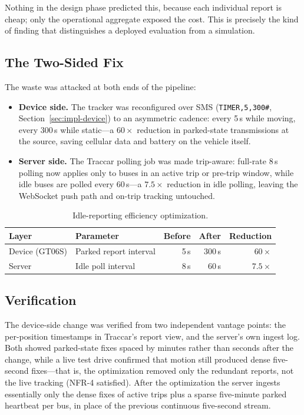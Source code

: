 Nothing in the design phase predicted this, because each individual
report is cheap; only the operational aggregate exposed the cost. This
is precisely the kind of finding that distinguishes a deployed
evaluation from a simulation.

\subsection{The Two-Sided Fix}
The waste was attacked at both ends of the pipeline:

\begin{itemize}
  \item \textbf{Device side.} The tracker was reconfigured over SMS
  (\texttt{TIMER,5,300\#}, Section~\ref{sec:impl-device}) to an
  asymmetric cadence: every 5\,s while moving, every 300\,s while
  static---a $60\times$ reduction in parked-state transmissions at the
  source, saving cellular data and battery on the vehicle itself.
  \item \textbf{Server side.} The Traccar polling job was made
  trip-aware: full-rate 8\,s polling now applies only to buses in an
  active trip or pre-trip window, while idle buses are polled every
  60\,s---a $7.5\times$ reduction in idle polling, leaving the WebSocket
  push path and on-trip tracking untouched.
\end{itemize}

\begin{table}[H]
\caption{Idle-reporting efficiency optimization.}
\label{tab:efficiency}
\centering
\begin{tabular}{@{}llrrr@{}}
\toprule
\textbf{Layer} & \textbf{Parameter} & \textbf{Before} & \textbf{After}
& \textbf{Reduction} \\
\midrule
Device (GT06S) & Parked report interval & 5\,s & 300\,s & $60\times$ \\
Server         & Idle poll interval     & 8\,s & 60\,s  & $7.5\times$ \\
\bottomrule
\end{tabular}
\end{table}

\subsection{Verification}
The device-side change was verified from two independent vantage
points: the per-position timestamps in Traccar's report view, and the
server's own ingest log. Both showed parked-state fixes spaced by
minutes rather than seconds after the change, while a live test drive
confirmed that motion still produced dense five-second fixes---that is,
the optimization removed only the redundant reports, not the live
tracking (NFR-4 satisfied). After the optimization the server ingests
essentially only the dense fixes of active trips plus a sparse
five-minute parked heartbeat per bus, in place of the previous
continuous five-second stream.

